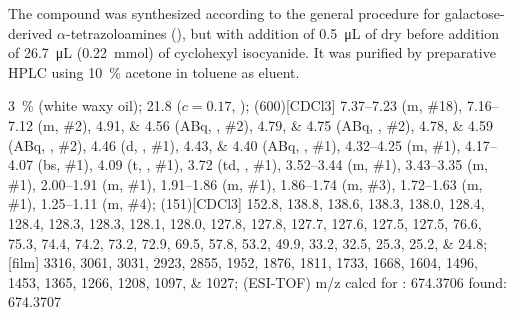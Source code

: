 The compound was synthesized according to the general procedure for galactose-derived $\alpha$-tetrazoloamines (),
but with addition of \SI{0.5}{\micro\liter} of dry  before addition of \SI{26.7}{\micro\liter} (\SI{0.22}{\milli\mol}) of cyclohexyl isocyanide.
It was purified by preparative HPLC using \SI{10}{\percent}  acetone in toluene as eluent.
\begin{fullexp}
	 \SI{3}{\percent} (white waxy oil); 
	\data{[$\alpha^{23}_D$]~$=$} \num{21.8} ($c = 0.17$, ); 
	\NMR(600)[CDCl3] \numrange{7.37}{7.23} (m, \#{18}), \numrange{7.16}{7.12} (m, \#{2}), \numlist{4.91;4.56} (ABq, , \#{2}), \numlist{4.79;4.75} (ABq, , \#{2}), \numlist{4.78;4.59} (ABq, , \#{2}), \num{4.46} (d, , \#{1}), \numlist{4.43;4.40} (ABq, , \#{1}), \numrange{4.32}{4.25} (m, \#{1}), \numrange{4.17}{4.07} (bs, \#{1}), \num{4.09} (t, , \#{1}), \num{3.72} (td, , \#{1}), \numrange{3.52}{3.44} (m, \#{1}), \numrange{3.43}{3.35} (m, \#{1}), \numrange{2.00}{1.91} (m, \#{1}), \numrange{1.91}{1.86} (m, \#{1}), \numrange{1.86}{1.74} (m, \#{3}), \numrange{1.72}{1.63} (m, \#{1}), \numrange{1.25}{1.11} (m, \#{4}); 
	(151)[CDCl3] \numlist{152.8; 138.8; 138.6; 138.3; 138.0; 128.4; 128.4; 128.3; 128.3; 128.1; 128.0; 127.8; 127.8; 127.7; 127.6; 127.5; 127.5; 76.6; 75.3; 74.4; 74.2; 73.2; 72.9; 69.5; 57.8; 53.2; 49.9; 33.2; 32.5; 25.3; 25.2; 24.8}; 
	[film] \numlist{3316; 3061; 3031; 2923; 2855; 1952; 1876; 1811; 1733; 1668; 1604; 1496; 1453; 1365; 1266; 1208; 1097; 1027}; 
	 (ESI-TOF) m/z calcd for : \num{674.3706} found: \num{674.3707}
\end{fullexp}

